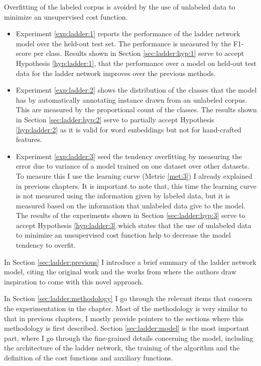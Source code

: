 \begin{subhypothesis}\label{hyp:ladder:3}
  Overfitting of the labeled corpus is avoided by the use of unlabeled data to
  minimize an unsupervised cost function.
\end{subhypothesis}

\begin{itemize}
  \item Experiment \ref{exp:ladder:1} reports the performance of the ladder
    network model over the held-out test set. The performance is measured by
    the F1-score per class. Results shown in Section \ref{sec:ladder:hyp:1}
    serve to accept Hypothesis \ref{hyp:ladder:1}, that the performance over a
    model on held-out test data for the ladder network improves over the
    previous methods.
  \item Experiment \ref{exp:ladder:2} shows the distribution of the classes
    that the model has by automatically annotating instance drawn from an
    unlabeled corpus. This are measured by the proportional count of the
    classes. The results shown in Section \ref{sec:ladder:hyp:2} serve to
    partially accept Hypothesis \ref{hyp:ladder:2} as it is valid for word
    embeddings but not for hand-crafted features.
  \item Experiment \ref{exp:ladder:3} seed the tendency overfitting by
    measuring the error due to variance of a model trained on one dataset over
    other datasets. To measure this I use the learning curve (Metric
    \ref{met:3}) I already explained in previous chapters. It is important to
    note that, this time the learning curve is not measured using the
    information given by labeled data, but it is measured based on the
    information that unlabeled data give to the model. The results of the
    experiments shown in Section \ref{sec:ladder:hyp:3} serve to accept
    Hypothesis \ref{hyp:ladder:3} which states that the use of unlabeled data
    to minimize an unsupervised cost function help to decrease the model
    tendency to overfit. 
\end{itemize}

In Section \ref{sec:ladder:previous} I introduce a brief summary of the ladder
network model, citing the original work and the works from where the authors
draw inspiration to come with this novel approach.

In Section \ref{sec:ladder:methodology} I go through the relevant items that
concern the experimentation in the chapter. Most of the methodology is very
similar to that in previous chapters, I mostly provide pointers to the sections
where this methodology is first described. Section \ref{sec:ladder:model} is
the most important part, where I go through the fine-grained details concerning
the model, including the architecture of the ladder network, the training of
the algorithm and the definition of the cost functions and auxiliary functions.

